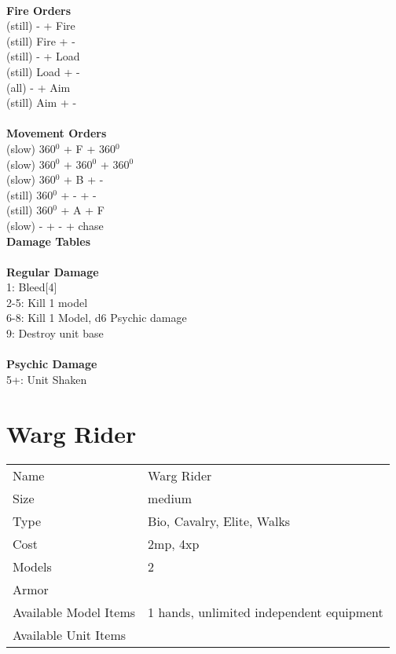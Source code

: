 \ \\ {\bf Fire Orders } \\
(still) - + Fire \\
(still) Fire + -  \\
(still) - + Load \\
(still) Load + - \\
(all) - + Aim \\
(still) Aim + -  \\
\ \\ {\bf Movement Orders } \\
(slow) 360$^0$ + F + 360$^0$ \\
(slow) 360$^0$ + 360$^0$ + 360$^0$ \\
(slow) 360$^0$ + B + - \\
(still) 360$^0$ + - + - \\
(still) 360$^0$ + A + F \\
(slow) - + - + chase \\



{\bf Damage Tables} \\
\ \\ {\bf Regular Damage } \\
1: Bleed[4] \\
2-5: Kill 1 model \\
6-8: Kill 1 Model, d6 Psychic damage \\
9: Destroy unit base \\
\ \\ {\bf Psychic Damage } \\
5+: Unit Shaken \\









\pagebreak

\section{ Warg Rider }

\begin{tabular}{ll}
  Name & Warg Rider \\
  Size & medium\\
  Type & Bio, Cavalry, Elite, Walks\\
  Cost & 2mp, 4xp\\
  Models & 2\\
  Armor & \\
  Available Model Items & 1 hands, unlimited independent equipment \\
  Available Unit Items &  \\
\end{tabular}

